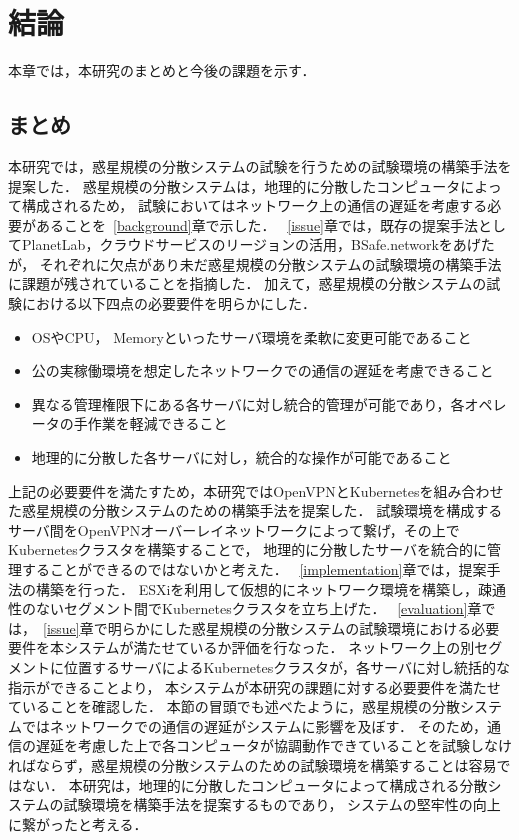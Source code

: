\chapter{結論}
\label{conclusion}

本章では，本研究のまとめと今後の課題を示す．

\section{まとめ}
\label{conclusion:conclusion}

本研究では，惑星規模の分散システムの試験を行うための試験環境の構築手法を提案した．
惑星規模の分散システムは，地理的に分散したコンピュータによって構成されるため，
試験においてはネットワーク上の通信の遅延を考慮する必要があることを~\ref{background}章で示した．
~\ref{issue}章では，既存の提案手法としてPlanetLab，クラウドサービスのリージョンの活用，BSafe.networkをあげたが，
それぞれに欠点があり未だ惑星規模の分散システムの試験環境の構築手法に課題が残されていることを指摘した．
加えて，惑星規模の分散システムの試験における以下四点の必要要件を明らかにした．
\begin{itemize}
  \item OSやCPU， Memoryといったサーバ環境を柔軟に変更可能であること
  \item 公の実稼働環境を想定したネットワークでの通信の遅延を考慮できること
  \item 異なる管理権限下にある各サーバに対し統合的管理が可能であり，各オペレータの手作業を軽減できること
  \item 地理的に分散した各サーバに対し，統合的な操作が可能であること
\end{itemize}
上記の必要要件を満たすため，本研究ではOpenVPNとKubernetesを組み合わせた惑星規模の分散システムのための構築手法を提案した．
試験環境を構成するサーバ間をOpenVPNオーバーレイネットワークによって繋げ，その上でKubernetesクラスタを構築することで，
地理的に分散したサーバを統合的に管理することができるのではないかと考えた．
~\ref{implementation}章では，提案手法の構築を行った．
ESXiを利用して仮想的にネットワーク環境を構築し，疎通性のないセグメント間でKubernetesクラスタを立ち上げた．
~\ref{evaluation}章では，~\ref{issue}章で明らかにした惑星規模の分散システムの試験環境における必要要件を本システムが満たせているか評価を行なった．
ネットワーク上の別セグメントに位置するサーバによるKubernetesクラスタが，各サーバに対し統括的な指示ができることより，
本システムが本研究の課題に対する必要要件を満たせていることを確認した．
本節の冒頭でも述べたように，惑星規模の分散システムではネットワークでの通信の遅延がシステムに影響を及ぼす．
そのため，通信の遅延を考慮した上で各コンピュータが協調動作できていることを試験しなければならず，惑星規模の分散システムのための試験環境を構築することは容易ではない．
本研究は，地理的に分散したコンピュータによって構成される分散システムの試験環境を構築手法を提案するものであり，
システムの堅牢性の向上に繋がったと考える．

